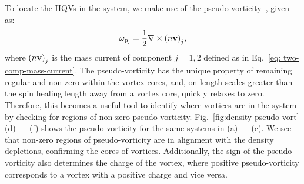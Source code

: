 To locate the HQVs in the system, we make use of the
pseudo-vorticity~\cite{Villois2016}, given as:
\begin{equation}
    \omega_\mathrm{p_j} = \frac{1}{2}\nabla \times {(n\vb{v})}_j,
\end{equation}
where \({(n\vb{v})}_j\) is the mass current of component \(j=1, 2\) defined as
in Eq.~\eqref{eq: two-comp-mass-current}.
The pseudo-vorticity has the unique property of remaining regular and non-zero
within the vortex cores, and, on length scales greater than the spin healing
length away from a vortex core, quickly relaxes to zero.
Therefore, this becomes a useful tool to identify where vortices are in the
system by checking for regions of non-zero pseudo-vorticity.
Fig.~\ref{fig:density-pseudo-vort} (d) --- (f) shows the pseudo-vorticity for
the same systems in (a) --- (c).
We see that non-zero regions of pseudo-vorticity are in alignment with the
density depletions, confirming the cores of vortices.
Additionally, the sign of the pseudo-vorticity also determines the charge of
the vortex, where positive pseudo-vorticity corresponds to a vortex with a
positive charge and vice versa.

